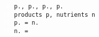 \begin{figure}[H]
    \texttt{
    \textcolor{white}{F} p., p., p., p. \\
    \textcolor{white}{FF} products p, nutrients n\\
    \textcolor{white}{FF} p. = n. \\ 
    \textcolor{white}{FF} n. = 
    }
\end{figure}
